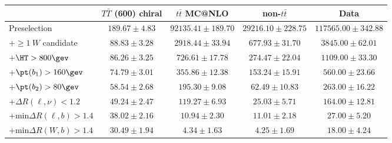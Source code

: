 \begin{tabular}{l c c c c } \toprule\toprule
 & $T\bar{T}$ (600) chiral 		 & $t\bar{t}$ MC@NLO 		 & non-$t\bar{t}$ 		 & Data 		 \\ \midrule 
  Preselection  & $189.67 \pm 4.83$  & $92135.41 \pm 189.70$  & $29216.10 \pm 228.75$  & $117565.00 \pm 342.88$ \\ 
 +$\geq 1~W$ candidate  & $88.83 \pm 3.28$  & $2918.44 \pm 33.94$  & $677.93 \pm 31.70$  & $3845.00 \pm 62.01$ \\ 
 +$\HT>800\gev$  & $86.26 \pm 3.25$  & $726.61 \pm 17.78$  & $274.47 \pm 22.04$  & $1109.00 \pm 33.30$ \\ 
 +$\pt(b_1) > 160\gev$  & $74.79 \pm 3.01$  & $355.86 \pm 12.38$  & $153.24 \pm 15.91$  & $560.00 \pm 23.66$ \\ 
 +$\pt(b_2) >80\gev$  & $58.54 \pm 2.68$  & $195.30 \pm 9.08$  & $62.49 \pm 10.83$  & $263.00 \pm 16.22$ \\ 
 +$\Delta R(\ell,\nu)<1.2$  & $49.24 \pm 2.47$  & $119.27 \pm 6.93$  & $25.03 \pm 5.71$  & $164.00 \pm 12.81$ \\ 
 +min$\Delta R(\ell,b)>1.4$  & $38.02 \pm 2.16$  & $10.94 \pm 2.30$  & $11.01 \pm 2.18$  & $27.00 \pm 5.20$ \\ 
 +min$\Delta R(W,b)>1.4$  & $30.49 \pm 1.94$  & $4.34 \pm 1.63$  & $4.25 \pm 1.69$  & $18.00 \pm 4.24$ \\ 
\bottomrule\end{tabular}